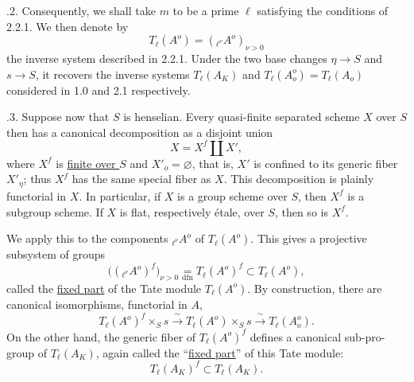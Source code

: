 \medskip
{}.2. Consequently, we shall take $m$ to be a prime $\ell$ satisfying
the conditions of 2.2.1.  We then denote by
\begin{equation}\tag{2.2.2.1}
 T_\ell(A^o)=({}_{\ell^\nu}A^o)_{\nu>0}
\end{equation}
the inverse system described in 2.2.1.  Under the two base changes
$\eta\longrightarrow S$ and $s\longrightarrow S$, it recovers the
inverse systems $T_\ell(A_K)$ and
$T_\ell(A_o^o)=T_\ell(A_o)$ considered in 1.0 and 2.1 respectively.

\medskip
{}.3. Suppose now that $S$ is henselian.  Every quasi-finite separated
scheme $X$ over $S$ then has a canonical decomposition as a disjoint
union
\begin{equation}\tag{2.2.3.1}
 X=X^f\coprod X',
\end{equation}
where $X^f$ is \underline{finite over $S$} and $X'_o=\varnothing$, that
is, $X'$ is confined to its generic fiber $X'_\eta$; thus $X^f$ has the
same special fiber as $X$.  This decomposition is plainly functorial in
$X$.  In particular, if $X$ is a group scheme over $S$, then $X^f$ is
a subgroup scheme.  If $X$ is flat, respectively \'{e}tale, over $S$,
then so is $X^f$.

We apply this to the components ${}_{\ell^\nu}A^o$ of $T_\ell(A^o)$.
This gives a projective subsystem of groups
\begin{equation}\tag{2.2.3.2}
 \bigl(({}_{\ell^\nu}A^o)^f\bigr)_{\nu>0}
 \underset{\mathrm{dfn}}{=}T_\ell(A^o)^f
 \subset T_\ell(A^o),
\end{equation}
called the \underline{fixed part} of the Tate module $T_\ell(A^o)$.
By construction, there are canonical isomorphisms, functorial in $A$,
\begin{equation}\tag{2.2.3.3}
 T_\ell(A^o)^f\times_S s\xrightarrow{\ \sim\ }
 T_\ell(A^o)\times_Ss\xrightarrow{\ \sim\ }T_\ell(A_o^o).
\end{equation}
On the other hand, the generic fiber of $T_\ell(A^o)^f$ defines a
canonical sub-pro-group of $T_\ell(A_K)$, again called the
``\underline{fixed part}'' of this Tate module:
\begin{equation}\tag{2.2.3.4}
 T_\ell(A_K)^f\subset T_\ell(A_K).
\end{equation}

